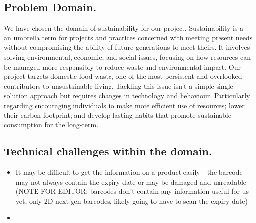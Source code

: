 \subsection{Problem Domain.}
We have chosen the domain of sustainability for our project. Sustainability is a an umbrella term for projects and practices concerned with meeting present needs without compromising the ability of  future generations to meet theirs. It involves solving environmental, economic, and social issues, focusing on how resources can be managed more responsibly to reduce waste and environmental impact. Our project targets domestic food waste, one of the most persistent and overlooked contributors to unsustainable living. Tackling this issue isn't a simple single solution approach but requires changes in technology and behaviour. Particularly regarding encouraging individuals to make more efficient use of resources; lower their carbon footprint; and develop lasting habits that promote sustainable consumption for the long-term.  
\par

\subsection{Technical challenges within the domain.}
\begin{itemize}
    \item It may be difficult to get the information on a product easily - the barcode may not always contain the expiry date or may be damaged and unreadable (NOTE FOR EDITOR: barcodes don't contain any information useful for us yet, only 2D next gen barcodes, likely going to have to scan the expiry date)
    \item 
\end{itemize}
\par

